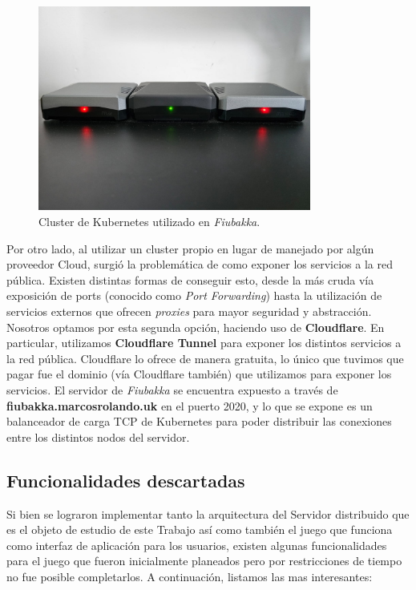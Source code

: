 \begin{figure}[htbp]
    \centering
    \includegraphics[width=0.8\textwidth]{../assets/fiubakka-cluster-pis.png}
    \caption{Cluster de Kubernetes utilizado en \textit{Fiubakka}.}
\end{figure}

Por otro lado, al utilizar un cluster propio en lugar de manejado por algún proveedor Cloud, surgió la problemática de como exponer los servicios a la red pública. Existen distintas formas de conseguir esto, desde la más cruda vía
exposición de ports (conocido como \textit{Port Forwarding}) hasta la utilización de servicios externos que ofrecen \textit{proxies} para mayor seguridad y abstracción. Nosotros optamos por esta segunda opción, haciendo uso de
\textbf{Cloudflare}. En particular, utilizamos \textbf{Cloudflare Tunnel} para exponer los distintos servicios a la red pública. Cloudflare lo ofrece de manera gratuita, lo único que tuvimos que pagar fue el dominio (vía Cloudflare
también) que utilizamos para exponer los servicios. El servidor de \textit{Fiubakka} se encuentra expuesto a través de \textbf{fiubakka.marcosrolando.uk} en el puerto 2020, y lo que se expone es un balanceador de carga TCP de Kubernetes
para poder distribuir las conexiones entre los distintos nodos del servidor.

\subsection{Funcionalidades descartadas}

Si bien se lograron implementar tanto la arquitectura del Servidor distribuido que es el objeto
de estudio de este Trabajo así como también el juego que funciona como interfaz de aplicación
para los usuarios, existen algunas funcionalidades para el juego que fueron inicialmente
planeados pero por restricciones de tiempo no fue posible completarlos. A continuación, listamos 
las mas interesantes:

